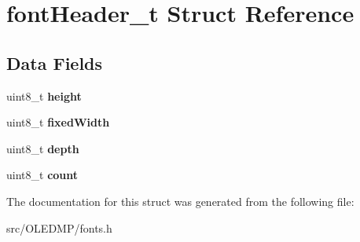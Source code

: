 \hypertarget{structfont_header__t}{}\section{font\+Header\+\_\+t Struct Reference}
\label{structfont_header__t}
\subsection*{Data Fields}
\begin{DoxyCompactItemize}
\item 
uint8\+\_\+t {\bfseries height}\hypertarget{structfont_header__t_adcf201a8aabf55cb352ec05331242594}{}\label{structfont_header__t_adcf201a8aabf55cb352ec05331242594}

\item 
uint8\+\_\+t {\bfseries fixed\+Width}\hypertarget{structfont_header__t_a0e5f53cd4ca2ff826fdc56228a05cfc4}{}\label{structfont_header__t_a0e5f53cd4ca2ff826fdc56228a05cfc4}

\item 
uint8\+\_\+t {\bfseries depth}\hypertarget{structfont_header__t_ab6f276082172be43a6041212071e377b}{}\label{structfont_header__t_ab6f276082172be43a6041212071e377b}

\item 
uint8\+\_\+t {\bfseries count}\hypertarget{structfont_header__t_a20302e2c99a60d3f612dba57e3f6333b}{}\label{structfont_header__t_a20302e2c99a60d3f612dba57e3f6333b}

\end{DoxyCompactItemize}


The documentation for this struct was generated from the following file\+:\begin{DoxyCompactItemize}
\item 
src/\+O\+L\+E\+D\+M\+P/fonts.\+h\end{DoxyCompactItemize}
